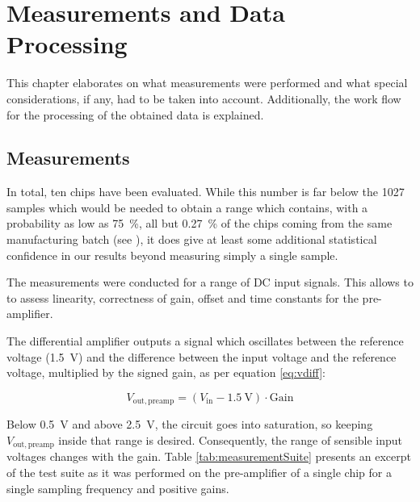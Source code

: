 \chapter{Measurements and Data Processing}
\label{chap:measurementProcess}


This chapter elaborates  on what measurements were performed  and what special
considerations, if any,  had to be taken into  account. Additionally, the work
flow for the processing of the obtained data is explained.


\section{Measurements}
\label{sec:measurements}

In total,  ten chips have been  evaluated. While this number is  far below the
\num{1027} samples  which would be  needed to  obtain a range  which contains,
with a probability as low as \SI{75}{\percent}, all but \SI{0.27}{\percent} of
the chips coming from the same manufacturing batch (see \cite{ref:3sfall}), it
does  give at  least some  additional  statistical confidence  in our  results
beyond measuring simply a single sample.

The measurements were  conducted for a range of DC  input signals. This allows
to to assess linearity, correctness of gain, offset and time constants for the
pre-amplifier.

The  differential amplifier  outputs  a signal  which  oscillates between  the
reference  voltage  (\SI{1.5}{\volt}) and  the  difference  between the  input
voltage  and the  reference voltage,  multiplied by  the signed  gain, as  per
equation \ref{eq:vdiff}:

\begin{equation}
    \label{eq:vdiff}
    V_{\mathrm{out, preamp}} = ( V_{\mathrm{in}} - \SI{1.5}{\volt} ) \cdot \mathrm{Gain}
\end{equation}

Below  \SI{0.5}{\volt}  and  above  \SI{2.5}{\volt},  the  circuit  goes  into
saturation,  so  keeping  $V_{\mathrm{out,  preamp}}$  inside  that  range  is
desired. Consequently, the range  of sensible input voltages  changes with the
gain. Table \ref{tab:measurementSuite}  presents an excerpt of  the test suite
as  it was  performed on  the  pre-amplifier of  a  single chip  for a  single
sampling frequency and positive gains.

